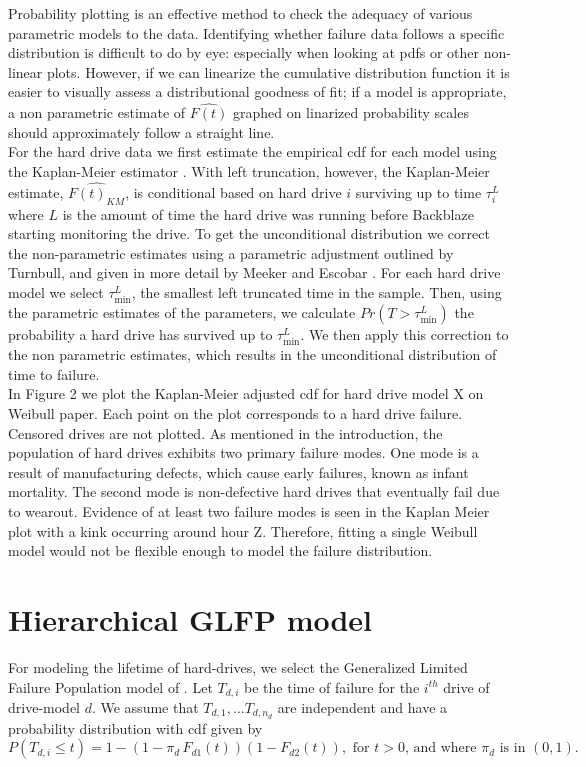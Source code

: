 \documentclass[12pt]{article}
\begin{document}
Probability plotting is an effective method to check the adequacy of various parametric models to the data.  Identifying whether failure data follows a specific distribution is difficult to do by eye: especially when looking at pdfs or other non-linear plots.  However, if we can linearize the cumulative distribution function it is easier to visually assess a distributional goodness of fit; if a model is appropriate, a non parametric estimate of $\hat{F(t)}$ graphed on linarized probability scales should approximately follow a straight line. \\

For the hard drive data we first estimate the empirical cdf for each model using the Kaplan-Meier estimator \cite{kaplan}.  With left truncation, however, the Kaplan-Meier estimate, $\widehat{F(t)_{KM}}$, is conditional based on hard drive $i$ surviving up to time $\tau_i^L$ where $L$ is the amount of time the hard drive was running before Backblaze starting monitoring the drive.  To get the unconditional distribution we correct the non-parametric estimates using a parametric adjustment outlined by Turnbull, and given in more detail by Meeker and Escobar \cite{turnbull,meeker}.  For each hard drive model we select $\tau_{\text{min}}^L$, the smallest left truncated time in the sample.  Then, using the parametric estimates of the parameters, we calculate $Pr(T>\tau_\text{min}^L)$ the probability a hard drive has survived up to $\tau_{\text{min}}^L$.  We then apply this correction to the non parametric estimates, which results in the unconditional distribution of time to failure.\\

In Figure 2 we plot the Kaplan-Meier adjusted cdf for hard drive model X on Weibull paper.  Each point on the plot corresponds to a hard drive failure.  Censored drives are not plotted.  As mentioned in the introduction, the population of hard drives exhibits two primary failure modes.  One mode is a result of manufacturing defects, which cause early failures, known as infant mortality.  The second mode is non-defective hard drives that eventually fail due to wearout.   Evidence of at least two failure modes is seen in the Kaplan Meier plot with a kink occurring around hour Z.  Therefore, fitting a single Weibull model would not be flexible enough to model the failure distribution.


\section{Hierarchical GLFP model}
For modeling the lifetime of hard-drives, we select the Generalized Limited Failure Population model of \citet{chan}.
Let $T_{d,i}$ be the time of failure for the $i^{th}$ drive of drive-model $d$.
We assume that $T_{d,1},\ldots T_{d,n_d}$ are independent and have a probability distribution with cdf given by
$$P(T_{d,i}\le t) = 1 - (1-\pi_d\, F_{d1}(t))(1 - F_{d2}(t)), \mbox{ for }t>0 \mbox{, and where } \pi_d \mbox{ is in }(0,1).$$
\end{document}
